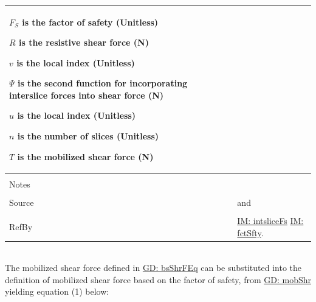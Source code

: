 \documentclass[12pt]{article}
\begin{document}
\begin{minipage}{\textwidth}
\begin{tabular}{p{} p{}}
\begin{symbDescription}
                                                                                           \item{${F_{S}}$ is the factor of safety (Unitless)}
                                                                                           \item{$R$ is the resistive shear force (N)}
                                                                                           \item{$v$ is the local index (Unitless)}
                                                                                           \item{$Ψ$ is the second function for incorporating interslice forces into shear force (N)}
                                                                                           \item{$u$ is the local index (Unitless)}
                                                                                           \item{$n$ is the number of slices (Unitless)}
                                                                                           \item{$T$ is the mobilized shear force (N)}
                                                                                           \end{symbDescription}
                                                                                           \\ \midrule \\
                                                                                           Notes & \\ \midrule \\
                                                                                                   Source & \cite{chen2005} and \cite{karchewski2012}
                                                                                                            \\ \midrule \\
                                                                                                            RefBy & \hyperref[IM:intsliceFs]{IM: intsliceFs} \hyperref[IM:fctSfty]{IM: fctSfty}.
\\ \bottomrule \end{tabular}
\end{minipage}\\
The mobilized shear force defined in \hyperref[GD:bsShrFEq]{GD: bsShrFEq} can be substituted into the definition of mobilized shear force based on the factor of safety, from \hyperref[GD:mobShr]{GD: mobShr} yielding equation (1) below:
\end{document}
